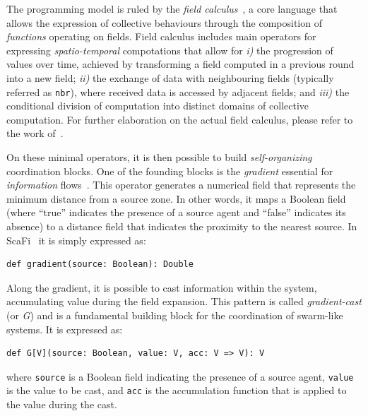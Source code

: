 \documentclass[conference]{IEEEtran}
\begin{document}
The programming model is ruled by the \emph{field calculus}~\cite{DBLP:conf/esocc/ViroliDB13,DBLP:journals/corr/ViroliADPB16,DBLP:journals/tocl/AudritoVDPB19}, 
 a core language that allows the expression of collective behaviours through the composition of \emph{functions} operating on fields.
%
Field calculus includes main operators for expressing \emph{spatio-temporal} compotations that allow for 
\emph{i)} the progression of values over time, achieved by transforming a field computed in a previous round into a new field; 
\emph{ii)} the exchange of data with neighbouring fields (typically referred as \lstinline|nbr|), where received data is accessed by adjacent fields; and 
\emph{iii)} the conditional division of computation into distinct domains of collective computation. 
%
For further elaboration on the actual field calculus, please refer to the work of~\cite{DBLP:journals/jlap/ViroliBDACP19}.

On these minimal operators, 
 it is then possible to build \emph{self-organizing} coordination blocks.
 One of the founding blocks is the \emph{gradient} essential for 
 \emph{information} flows~\cite{DBLP:conf/saso/WolfH07}.
%
This operator generates a numerical field that represents the minimum distance from a source zone. 
%
In other words, it maps a Boolean field (where ``true'' indicates the presence of a source agent and ``false'' indicates its absence) to a distance field that indicates the proximity to the nearest source. 
%
In ScaFi~\cite{casadei2022scafi} %
 it is simply expressed as:
\begin{lstlisting}
def gradient(source: Boolean): Double
\end{lstlisting}
Along the gradient, it is possible to cast information within the system, accumulating value during the field expansion. 
This pattern is called \emph{gradient-cast} (or \emph{G}) and is a fundamental building block for the coordination of swarm-like systems.
It is expressed as: 
\begin{lstlisting}
def G[V](source: Boolean, value: V, acc: V => V): V
\end{lstlisting}
where \texttt{source} is a Boolean field indicating the presence of a source agent, 
 \texttt{value} is the value to be cast, and 
 \texttt{acc} is the accumulation function that is applied to the value during the cast.
\end{document}
